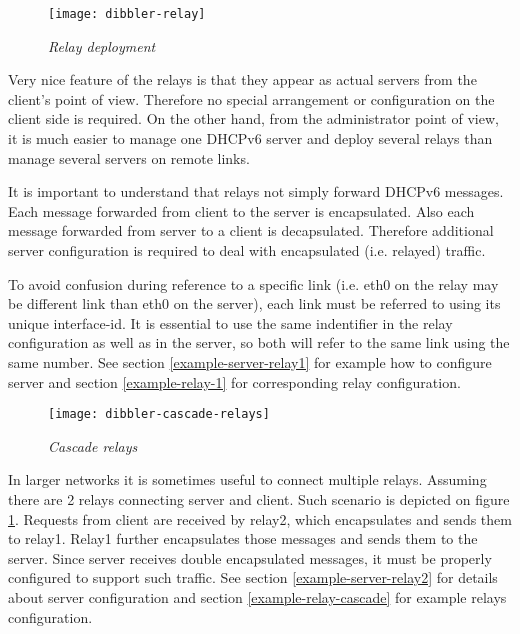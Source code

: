 \begin{figure}[ht]
\begin{center}
\texttt{[image: dibbler-relay]}
\caption{\emph{Relay deployment}}
\end{center}
\end{figure}

Very nice feature of the relays is that they appear as actual servers
from the client's point of view. Therefore no special arrangement or
configuration on the client side is required. On the other hand, from
the administrator point of view, it is much easier to manage one DHCPv6
server and deploy several relays than manage several servers on remote
links.

It is important to understand that relays not simply forward DHCPv6
messages. Each message forwarded from client to the server is
encapsulated. Also each message forwarded from server to a client is
decapsulated. Therefore additional server configuration is required to
deal with encapsulated (i.e. relayed) traffic.

To avoid confusion during reference to a specific link (i.e. eth0 on
the relay may be different link than eth0 on the server), each link
must be referred to using its unique interface-id. It is essential to 
use the same indentifier in the relay
configuration as well as in the server, so both will refer to the same
link using the same number. See section \ref{example-server-relay1} for
example how to configure server and section \ref{example-relay-1} for
corresponding relay configuration.

\begin{figure}[ht]
\begin{center}
\texttt{[image: dibbler-cascade-relays]}
\caption{\emph{Cascade relays}}
\label{fig-cascade-relays}
\end{center}
\end{figure}

In larger networks it is sometimes useful to connect multiple
relays. Assuming there are 2 relays connecting server and client. Such
scenario is depicted on figure \ref{fig-cascade-relays}. Requests from
client are received by relay2, which encapsulates and sends them to
relay1. Relay1 further encapsulates those messages and sends them to
the server. Since server receives double encapsulated messages, it
must be properly configured to support such traffic. See section
\ref{example-server-relay2} for details about server configuration and
section \ref{example-relay-cascade} for example relays configuration.

